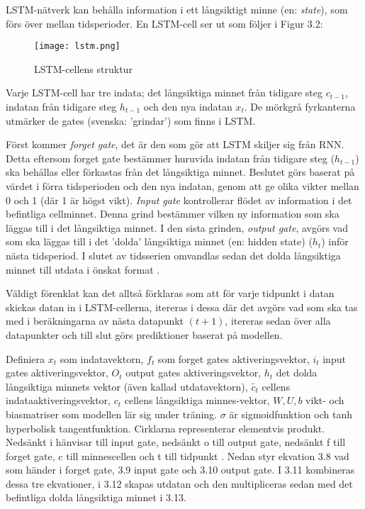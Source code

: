 \documentclass[11pt]{article}
\numberwithin{equation}{section}
\numberwithin{table}{section}
\numberwithin{figure}{section}
\begin{document}
LSTM-nätverk kan behålla information i ett långsiktigt minne (en: \textit{state}), som förs över mellan tidsperioder. En LSTM-cell ser ut som följer i Figur 3.2:
\begin{figure}[H]
\caption{LSTM-cellens struktur \parencite[lånad från][]{yuan2019nonlinear}}
\texttt{[image: lstm.png]}
\centering
\end{figure}

Varje LSTM-cell har tre indata; det långsiktiga minnet från tidigare steg \(c_{t-1}\), indatan från tidigare steg \(h_{t-1}\) och den nya indatan \(x_{t}\). De mörkgrå fyrkanterna utmärker de gates (svenska: 'grindar') som finns i LSTM. 

Först kommer \textit{forget gate}, det är den som gör att LSTM skiljer sig från RNN. Detta eftersom forget gate bestämmer huruvida indatan från tidigare steg (\(h_{t-1}\)) ska behållas eller förkastas från det långsiktiga minnet. Beslutet görs baserat på värdet i förra tidsperioden och den nya indatan, genom att ge olika vikter mellan 0 och 1 (där 1 är högst vikt). \textit{Input gate} kontrollerar flödet av information i det befintliga cellminnet. Denna grind bestämmer vilken ny information som ska läggas till i det långsiktiga minnet. I den sista grinden, \textit{output gate}, avgörs vad som ska läggas till i det 'dolda' långsiktiga minnet (en: hidden state) (\(h_{t}\)) inför nästa tidsperiod. I slutet av tidsserien omvandlas sedan det dolda långsiktiga minnet till utdata i önskat format \parencite[][,s.478-559]{purkait2019hands}.

Väldigt förenklat kan det alltså förklaras som  att för varje tidpunkt i datan skickas datan in i LSTM-cellerna, itereras i dessa där det avgörs vad som ska tas med i beräkningarna av nästa datapunkt $(t+1)$, itereras sedan över alla datapunkter och till slut görs prediktioner baserat på modellen. 

Definiera \(x_t\) som indatavektorn, \(f_t\) som forget gates aktiveringsvektor, \(i_t\) input gates aktiveringsvektor, \(O_t\) output gates aktiveringsvektor, \(h_t\) det dolda långsiktiga minnets vektor (även kallad utdatavektorn), \(\tilde{c_t}\) cellens indataaktiveringsvektor, \(c_t\) cellens långsiktiga minnes-vektor, \(W, U, b\) vikt- och biasmatriser som modellen lär sig under träning. \(\sigma\) är sigmoidfunktion och tanh hyperbolisk tangentfunktion. Cirklarna representerar elementvis produkt. Nedsänkt i hänvisar till input gate, nedsänkt o till output gate, nedsänkt f till forget gate, c till minnescellen och t till tidpunkt \parencite[][,s.478-559]{purkait2019hands}. Nedan styr ekvation 3.8 vad som händer i forget gate, 3.9 input gate och 3.10 output gate. I 3.11 kombineras dessa tre ekvationer, i 3.12 skapas utdatan och den multipliceras sedan med det befintliga dolda långsiktiga minnet i 3.13.
\end{document}
